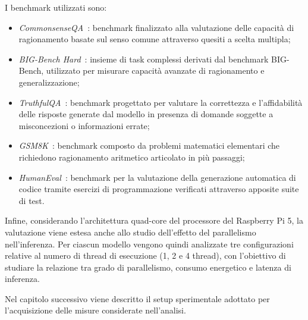 I benchmark utilizzati sono:

\begin{itemize}
    \item \textit{CommonsenseQA}~\cite{commonsenseqa}: benchmark finalizzato alla valutazione delle
    capacità di ragionamento basate sul senso comune attraverso quesiti a
    scelta multipla;

    \item \textit{BIG-Bench Hard}~\cite{bbh}: insieme di task complessi derivati dal
    benchmark BIG-Bench, utilizzato per misurare capacità avanzate di
    ragionamento e generalizzazione;

    \item \textit{TruthfulQA}~\cite{truthfulqa}: benchmark progettato per valutare la
    correttezza e l'affidabilità delle risposte generate dal modello in
    presenza di domande soggette a misconcezioni o informazioni errate;

    \item \textit{GSM8K}~\cite{gsm8k}: benchmark composto da problemi matematici elementari
    che richiedono ragionamento aritmetico articolato in più passaggi;

    \item \textit{HumanEval}~\cite{humaneval}: benchmark per la valutazione della generazione
    automatica di codice tramite esercizi di programmazione verificati
    attraverso apposite suite di test.
\end{itemize}

Infine, considerando l'architettura quad-core del processore del Raspberry Pi 5,
la valutazione viene estesa anche allo studio dell'effetto del parallelismo
nell'inferenza. Per ciascun modello vengono quindi analizzate tre configurazioni
relative al numero di thread di esecuzione (1, 2 e 4 thread), con l'obiettivo
di studiare la relazione tra grado di parallelismo, consumo energetico e
latenza di inferenza.

Nel capitolo successivo viene descritto il setup sperimentale adottato per
l'acquisizione delle misure considerate nell'analisi.
